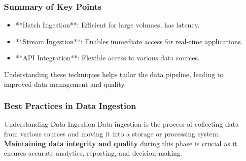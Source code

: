 \documentclass[aspectratio=169]{beamer}
\begin{document}
\begin{frame}[fragile]
    \frametitle{Summary of Key Points}
    \begin{itemize}
        \item **Batch Ingestion**: Efficient for large volumes, has latency.
        \item **Stream Ingestion**: Enables immediate access for real-time applications.
        \item **API Integration**: Flexible access to various data sources.
    \end{itemize}
    Understanding these techniques helps tailor the data pipeline, leading to improved data management and quality.
\end{frame}

\begin{frame}[fragile]
    \frametitle{Best Practices in Data Ingestion}
    \begin{block}{Understanding Data Ingestion}
        Data ingestion is the process of collecting data from various sources and moving it into a storage or processing system. \textbf{Maintaining data integrity and quality} during this phase is crucial as it ensures accurate analytics, reporting, and decision-making.
    \end{block}
\end{frame}
\end{document}
